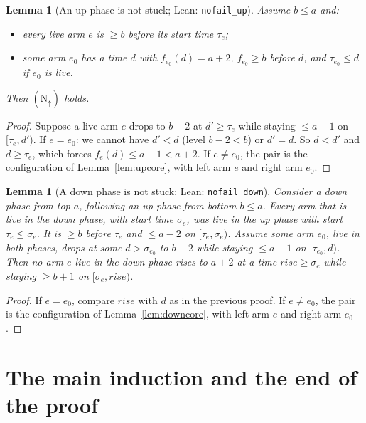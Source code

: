 \documentclass[11pt]{article}
\newtheorem{lemma}[theorem]{Lemma}
\theoremstyle{definition}
\theoremstyle{remark}
\newcommand{\lean}[1]{\texttt{#1}}
\begin{document}
\begin{lemma}[An up phase is not stuck; Lean: \lean{nofail\_up}]\label{lem:nofailup}
Assume $b\le a$ and:
\begin{itemize}
\item every live arm $e$ is $\ge b$ before its start time $\tau_e$;
\item some arm $e_0$ has a time $d$ with $f_{e_0}(d)=a+2$, $f_{e_0}\ge b$
before $d$, and $\tau_{e_0}\le d$ if $e_0$ is live.
\end{itemize}
Then $(\mathrm N_\uparrow)$ holds.
\end{lemma}
\begin{proof}
Suppose a live arm $e$ drops to $b-2$ at $d'\ge\tau_e$ while staying $\le a-1$
on $[\tau_e,d')$. If $e=e_0$: we cannot have $d'<d$ (level $b-2<b$) or
$d'=d$. So $d<d'$ and $d\ge\tau_e$, which forces $f_e(d)\le a-1<a+2$. If
$e\ne e_0$, the pair is the configuration of Lemma~\ref{lem:upcore}, with left
arm $e$ and right arm $e_0$.
\end{proof}

\begin{lemma}[A down phase is not stuck; Lean: \lean{nofail\_down}]\label{lem:nofaildown}
Consider a down phase from top $a$, following an up phase from bottom $b\le a$.
Every arm that is live in the down phase, with start time $\sigma_e$, was live
in the up phase with start $\tau_e\le\sigma_e$. It is $\ge b$ before $\tau_e$
and $\le a-2$ on $[\tau_e,\sigma_e)$. Assume some arm $e_0$, live in both
phases, drops at some $d>\sigma_{e_0}$ to $b-2$ while staying $\le a-1$ on
$[\tau_{e_0},d)$. Then no arm $e$ live in the down phase rises to $a+2$ at a
time $\mathit{rise}\ge\sigma_e$ while staying $\ge b+1$ on
$[\sigma_e,\mathit{rise})$.
\end{lemma}
\begin{proof}
If $e=e_0$, compare $\mathit{rise}$ with $d$ as in the previous proof. If
$e\ne e_0$, the pair is the configuration of Lemma~\ref{lem:downcore}, with
left arm $e$ and right arm $e_0$.
\end{proof}

\section{The main induction and the end of the proof}\label{sec:induction}
\end{document}
